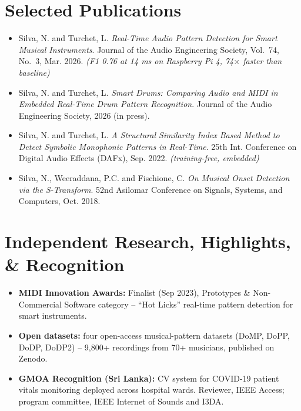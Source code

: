 \documentclass[11pt]{article}
\begin{document}
\section*{Selected Publications \footnotesize {}}
\begin{itemize}[leftmargin=1.2em, itemsep=-0.25em]
    \item Silva, N. and Turchet, L. \textit{Real-Time Audio Pattern Detection for Smart Musical Instruments}. Journal of the Audio Engineering Society, Vol.~74, No.~3, Mar. 2026. \textit{(F1 0.76 at 14 ms on Raspberry Pi 4, 74$\times$ faster than baseline)}
    \item Silva, N. and Turchet, L. \textit{Smart Drums: Comparing Audio and MIDI in Embedded Real-Time Drum Pattern Recognition}. Journal of the Audio Engineering Society, 2026 (in press).
    \item Silva, N. and Turchet, L. \textit{A Structural Similarity Index Based Method to Detect Symbolic Monophonic Patterns in Real-Time}. 25th Int. Conference on Digital Audio Effects (DAFx), Sep. 2022. \textit{(training-free, embedded)}
    \item Silva, N., Weeraddana, P.C. and Fischione, C. \textit{On Musical Onset Detection via the S-Transform}. 52nd Asilomar Conference on Signals, Systems, and Computers, Oct. 2018.
\end{itemize}

\vspace{-1em}
\section*{Independent Research, Highlights, \& Recognition}
\begin{itemize}[leftmargin=1.2em, itemsep=-0.25em]
    \item \textbf{MIDI Innovation Awards:} Finalist (Sep 2023), Prototypes \& Non-Commercial Software category -- ``Hot Licks'' real-time pattern detection for smart instruments.
    \item \textbf{Open datasets:} four open-access musical-pattern datasets (DoMP, DoPP, DoDP, DoDP2) -- 9,800+ recordings from 70+ musicians, published on Zenodo.
    \item \textbf{GMOA Recognition (Sri Lanka):} CV system for COVID-19 patient vitals monitoring deployed across hospital wards. Reviewer, IEEE Access; program committee, IEEE Internet of Sounds and I3DA.
\end{itemize}
\end{document}
